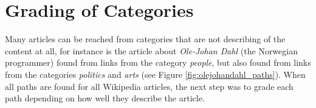 \section{Grading of Categories}

\begin{comment}
The structure of Wikipedia could be considered confusing since anyone can edit. This means that the underlying category structure of Wikipedia contains lots of links between all categories. 

This means that it is possible to reach almost all articles from each category. 

This means that there are categories that reach lots of other categories. These should not be considered as important as the other categories. A program was made to find these categories. 

There are 28 top categories (direct subcategories of %

The main assumption is that if a category leads to many of the top categories, it is possible to reach lots of articles which are not associated with the category. 

Eksempel på hvordan kategorier finner artikler som ikke har noen sammenheng med kategorien.

If a category leads to many of these 
The top categories (28) leads to lots of subcategories. 

Another way of finding categories that does not provide information about the path, is to find all categories with many parent categories and with many subcategories since this means that they easily can reach categories not relevant for the category. 

Hence a program was made to find the number of parent categories and subcategories for each category. 
\end{comment}

Many articles can be reached from categories that are not describing of the content at all, for instance is the article about \emph{Ole-Johan Dahl} (the Norwegian programmer) found from links from the category \emph{people}, but also found from links from the categories \emph{politics} and \emph{arts} (see Figure \ref{fig:olejohandahl_paths}). When all paths are found for all Wikipedia articles, the next step was to grade each path depending on how well they describe the article. 

